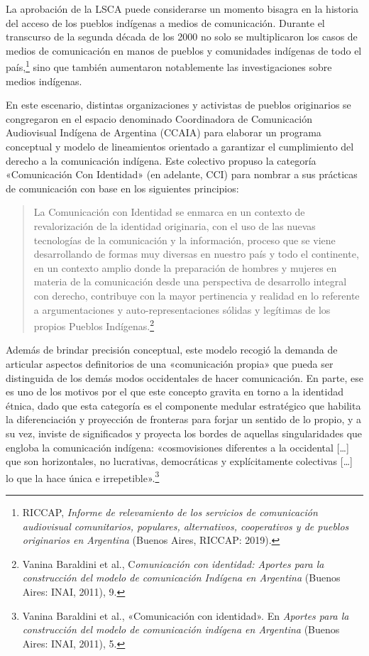 \documentclass{tufte-handout}
\begin{document}
La aprobación de la LSCA puede considerarse un momento bisagra en la
historia del acceso de los pueblos indígenas a medios de comunicación.
Durante el transcurso de la segunda década de los 2000 no solo se
multiplicaron los casos de medios de comunicación en manos de pueblos y
comunidades indígenas de todo el país,\footnote{RICCAP, \emph{Informe de
  relevamiento de los servicios de comunicación audiovisual
  comunitarios, populares, alternativos, cooperativos y de pueblos
  originarios en Argentina} (Buenos Aires, RICCAP: 2019).} sino que
también aumentaron notablemente las investigaciones sobre medios
indígenas.

En este escenario, distintas organizaciones y activistas de pueblos
originarios se congregaron en el espacio denominado Coordinadora de
Comunicación Audiovisual Indígena de Argentina (CCAIA) para elaborar un
programa conceptual y modelo de lineamientos orientado a garantizar el
cumplimiento del derecho a la comunicación indígena. Este colectivo
propuso la categoría «Comunicación Con Identidad» (en adelante, CCI)
para nombrar a sus prácticas de comunicación con base en los siguientes
principios:

\begin{quote}
La Comunicación con Identidad se enmarca en un contexto de
revalorización de la identidad originaria, con el uso de las nuevas
tecnologías de la comunicación y la información, proceso que se viene
desarrollando de formas muy diversas en nuestro país y todo el
continente, en un contexto amplio donde la preparación de hombres y
mujeres en materia de la comunicación desde una perspectiva de
desarrollo integral con derecho, contribuye con la mayor pertinencia y
realidad en lo referente a argumentaciones y auto-representaciones
sólidas y legítimas de los propios Pueblos Indígenas.\footnote{Vanina
  Baraldini et al., C\emph{omunicación con identidad: Aportes para la
  construcción del modelo de comunicación Indígena en Argentina} (Buenos
  Aires: INAI, 2011), 9.}
\end{quote}

\noindent Además de brindar precisión conceptual, este modelo recogió la demanda
de articular aspectos definitorios de una «comunicación propia» que
pueda ser distinguida de los demás modos occidentales de hacer
comunicación. En parte, ese es uno de los motivos por el que este
concepto gravita en torno a la identidad étnica, dado que esta categoría
es el componente medular estratégico que habilita la diferenciación y
proyección de fronteras para forjar un sentido de lo propio, y a su vez,
inviste de significados y proyecta los bordes de aquellas singularidades
que engloba la comunicación indígena: «cosmovisiones diferentes a la
occidental {[}\ldots{]} que son horizontales, no lucrativas,
democráticas y explícitamente colectivas {[}\ldots{]} lo que la hace
única e irrepetible».\footnote{Vanina Baraldini et al., «Comunicación
  con identidad». En \emph{Aportes para la construcción del modelo de
  comunicación indígena en Argentina} (Buenos Aires: INAI, 2011), 5.}
\end{document}
